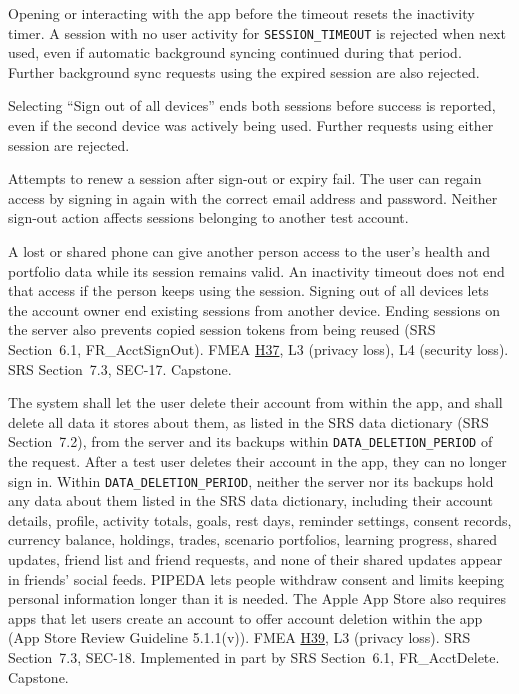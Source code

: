 \documentclass{article}
\newcommand{\hazref}[1]{\hyperref[#1]{#1}}
\begin{document}
\begin{description}
{Opening or interacting with the app before the timeout resets the inactivity timer. A session with no user activity for \texttt{SESSION\_TIMEOUT} is rejected when next used, even if automatic background syncing continued during that period. Further background sync requests using the expired session are also rejected.

Selecting ``Sign out of all devices'' ends both sessions before success is reported, even if the second device was actively being used. Further requests using either session are rejected.

Attempts to renew a session after sign-out or expiry fail. The user can regain access by signing in again with the correct email address and password. Neither sign-out action affects sessions belonging to another test account.}
{A lost or shared phone can give another person access to the user's health and portfolio data while its session remains valid. An inactivity timeout does not end that access if the person keeps using the session. Signing out of all devices lets the account owner end existing sessions
from another device. Ending sessions on the server also prevents copied session tokens from being reused (SRS Section~6.1, FR\_AcctSignOut).}
{FMEA \hazref{H37}, L3 (privacy loss), L4 (security loss).}
{SRS Section~7.3, SEC-17.}
{Capstone.}

{The system shall let the user delete their account from within the app, and
shall delete all data it stores about them, as listed in the SRS data
dictionary (SRS Section~7.2), from the server and its backups within
\texttt{DATA\_DELETION\_PERIOD} of the request.}
{After a test user deletes their account in the app, they can no longer sign
in. Within \texttt{DATA\_DELETION\_PERIOD}, neither the server nor its backups
hold any data about them listed in the SRS data dictionary, including their
account details, profile, activity totals, goals, rest days, reminder
settings, consent records, currency balance, holdings, trades, scenario
portfolios, learning progress, shared updates, friend list and friend
requests, and none of their shared updates appear in friends' social feeds.}
{PIPEDA lets people withdraw consent and limits keeping personal information
longer than it is needed. The Apple App Store also requires apps that let users
create an account to offer account deletion within the app (App Store Review
Guideline 5.1.1(v)).}
{FMEA \hazref{H39}, L3 (privacy loss).}
{SRS Section~7.3, SEC-18. Implemented in part by SRS
Section~6.1, FR\_AcctDelete.}
{Capstone.}



\end{description}
\end{document}
